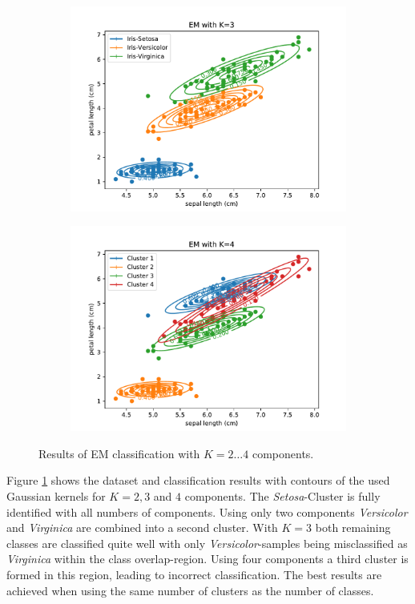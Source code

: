\documentclass{article}
\begin{document}
\begin{figure}[!ht]
{\begin{subfigure}{0.6\textwidth}
	\includegraphics[width=\textwidth]{./Figures/2_1_EM_cont_K3}
	\end{subfigure}
	\begin{subfigure}{0.6\textwidth}
	\includegraphics[width=\textwidth]{./Figures/2_1_EM_cont_K4}
	\end{subfigure}
	}	
	\caption{Results of EM classification with $K=2\dots4$ components.}
	\label{2_1_EM_cont}
\end{figure}

Figure \ref{2_1_EM_cont} shows the dataset and classification results with contours of the used Gaussian kernels for $K=2,3$ and $4$ components. The \textit{Setosa}-Cluster is fully identified with all numbers of components. Using only two components \textit{Versicolor} and \textit{Virginica} are combined into a second cluster. With $K=3$ both remaining classes are classified quite well with only \textit{Versicolor}-samples being misclassified as \textit{Virginica} within the class overlap-region. Using four components a third cluster is formed in this region, leading to incorrect classification. The best results are achieved when using the same number of clusters as the number of classes.
\end{document}
